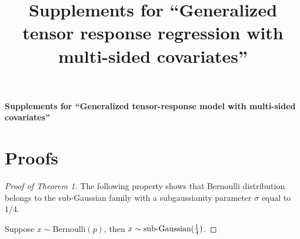 \documentclass[11pt]{article}
\title{Supplements for ``Generalized tensor response regression with multi-sided covariates''}
\theoremstyle{plain}
\theoremstyle{definition}
\begin{document}
\begin{center}
\begin{spacing}{1.5}
\textbf{\Large Supplements for ``Generalized tensor-response model with multi-sided covariates''}
\end{spacing}
\end{center}

\section{Proofs}
\begin{proof}[Proof of Theorem 1]
The following property shows that Bernoulli distribution belongs to the sub-Gaussian family with a subgaussianity parameter $\sigma$ equal to $1/4$.

Suppose $x \sim \text{Bernoulli}(p)$, then $x\sim \text{sub-Gaussian}({1\over 4})$.
\end{proof}
\end{document}
